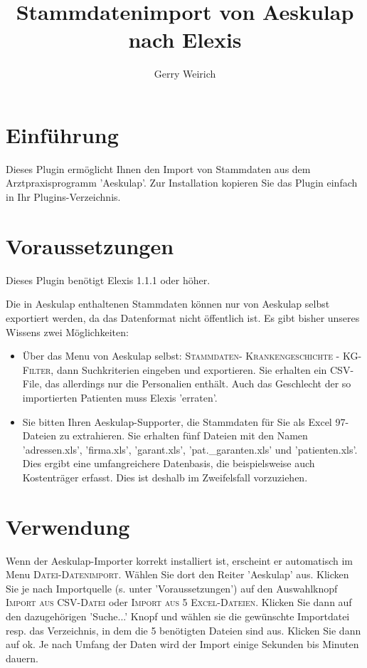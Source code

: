 \documentclass[a4paper]{scrartcl}
\title{Stammdatenimport von Aeskulap nach Elexis\textsuperscript{\textregistered}}
\author{Gerry Weirich}
\begin{document}
\maketitle
\section{Einführung}

Dieses Plugin ermöglicht Ihnen den Import von Stammdaten aus dem Arztpraxisprogramm 'Aeskulap'.
Zur Installation kopieren Sie das Plugin einfach in Ihr Plugins-Verzeichnis.

\section{Voraussetzungen}
Dieses Plugin benötigt Elexis 1.1.1 oder höher.

\medskip

Die in Aeskulap enthaltenen Stammdaten können nur von Aeskulap selbst exportiert werden, da das Datenformat nicht öffentlich ist. Es gibt bisher unseres Wissens zwei Möglichkeiten:
\begin{itemize}
  \item Über das Menu von Aeskulap selbst: \textsc{Stammdaten- Krankengeschichte - KG-Filter}, dann Suchkriterien eingeben und exportieren. Sie erhalten ein CSV-File, das allerdings nur die Personalien enthält. Auch das Geschlecht der so importierten Patienten muss Elexis 'erraten'.
  \item Sie bitten Ihren Aeskulap-Supporter, die Stammdaten für Sie als Excel 97-Dateien zu extrahieren. Sie erhalten fünf Dateien mit den Namen 'adressen.xls', 'firma.xls', 'garant.xls', 'pat.\_garanten.xls' und 'patienten.xls'. Dies ergibt eine umfangreichere Datenbasis, die beispielsweise auch Kostenträger erfasst. Dies ist deshalb im Zweifelsfall vorzuziehen.
\end{itemize}

\section{Verwendung}
Wenn der Aeskulap-Importer korrekt installiert ist, erscheint er automatisch im Menu \textsc{Datei-Datenimport}. Wählen Sie dort den Reiter 'Aeskulap' aus. Klicken Sie je nach Importquelle (s. unter 'Voraussetzungen') auf den Auswahlknopf \textsc{Import aus CSV-Datei} oder \textsc{Import aus 5 Excel-Dateien}. Klicken Sie dann auf den dazugehörigen 'Suche...' Knopf und wählen sie die gewünschte Importdatei resp. das Verzeichnis, in dem die 5 benötigten Dateien sind aus. Klicken Sie dann auf ok. Je nach Umfang der Daten wird der Import einige Sekunden bis Minuten dauern.
\end{document}
